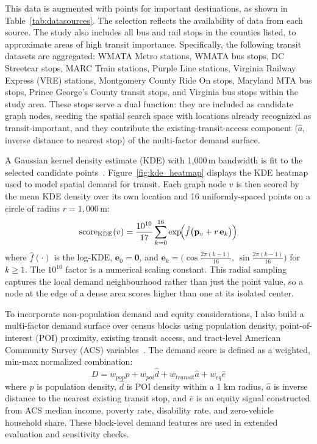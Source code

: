 \documentclass[sigconf,nonacm]{acmart}
\begin{document}
This data is augmented with points for important destinations, as shown in Table~\ref{tab:datasources}. The selection reflects the availability of data from each source. The study also includes all bus and rail stops in the counties listed, to approximate areas of high transit importance. Specifically, the following transit datasets are aggregated: WMATA Metro stations, WMATA bus stops, DC Streetcar stops, MARC Train stations, Purple Line stations, Virginia Railway Express (VRE) stations, Montgomery County Ride On stops, Maryland MTA bus stops, Prince George's County transit stops, and Virginia bus stops within the study area. These stops serve a dual function: they are included as candidate graph nodes, seeding the spatial search space with locations already recognized as transit-important, and they contribute the existing-transit-access component ($\hat{a}$, inverse distance to nearest stop) of the multi-factor demand surface.

A Gaussian kernel density estimate (KDE) with 1,000\,m bandwidth is fit to the selected candidate points~\cite{bib:silverman1986density}. Figure~\ref{fig:kde_heatmap} displays the KDE heatmap used to model spatial demand for transit. Each graph node $v$ is then scored by the mean KDE density over its own location and 16 uniformly-spaced points on a circle of radius $r = 1{,}000$\,m:
\[
  \mathrm{score}_{\mathrm{KDE}}(v) = \frac{10^{10}}{17}\sum_{k=0}^{16}
    \exp\!\Bigl(\hat{f}\bigl(\mathbf{p}_v + r\,\mathbf{e}_k\bigr)\Bigr)
\]
where $\hat{f}(\cdot)$ is the log-KDE, $\mathbf{e}_0 = \mathbf{0}$, and $\mathbf{e}_k = \bigl(\cos\tfrac{2\pi(k-1)}{16},\,\sin\tfrac{2\pi(k-1)}{16}\bigr)$ for $k \geq 1$. The $10^{10}$ factor is a numerical scaling constant. This radial sampling captures the local demand neighbourhood rather than just the point value, so a node at the edge of a dense area scores higher than one at its isolated center.

To incorporate non-population demand and equity considerations, I also build a multi-factor demand surface over census blocks using population density, point-of-interest (POI) proximity, existing transit access, and tract-level American Community Survey (ACS) variables~\cite{lit:acs2022}. The demand score is defined as a weighted, min-max normalized combination:
\[
    D = w_{pop}\hat{p} + w_{poi}\hat{d} + w_{transit}\hat{a} + w_{eq}\hat{e}
\]
where $\hat{p}$ is population density, $\hat{d}$ is POI density within a 1 km radius, $\hat{a}$ is inverse distance to the nearest existing transit stop, and $\hat{e}$ is an equity signal constructed from ACS median income, poverty rate, disability rate, and zero-vehicle household share. These block-level demand features are used in extended evaluation and sensitivity checks.
\end{document}
